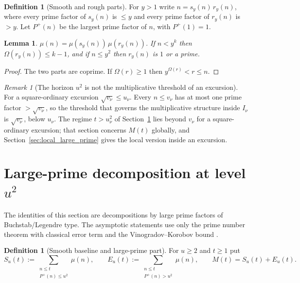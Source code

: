\documentclass[11pt]{amsart}
\numberwithin{equation}{section}
\theoremstyle{plain}
\newtheorem{lemma}[theorem]{Lemma}
\theoremstyle{definition}
\newtheorem{definition}[theorem]{Definition}
\theoremstyle{remark}
\newtheorem{remark}[theorem]{Remark}
\newcommand{\Pp}{P^{+}}
\begin{document}
\begin{definition}[Smooth and rough parts]
\label{def:smooth_rough}
For $y>1$ write $n=s_y(n)\,r_y(n)$, where every prime factor of $s_y(n)$
is $\le y$ and every prime factor of $r_y(n)$ is $>y$. Let $\Pp(n)$ be the
largest prime factor of $n$, with $\Pp(1)=1$.
\end{definition}

\begin{lemma}
\label{lem:rough_part}
$\mu(n)=\mu(s_y(n))\,\mu(r_y(n))$. If $n<y^k$ then $\Omega(r_y(n))\le k-1$,
and if $n\le y^2$ then $r_y(n)$ is $1$ or a prime.
\end{lemma}

\begin{proof}
The two parts are coprime. If $\Omega(r)\ge1$ then $y^{\Omega(r)}<r\le n$.
\end{proof}

\begin{remark}[The horizon $u^2$ is not the multiplicative threshold of an excursion]
\label{rem:horizon_inactive}
For a square-ordinary excursion $\sqrt{v_\nu}\le u_\nu$. Every $n\le v_\nu$
has at most one prime factor $>\sqrt{v_\nu}$, so the threshold that governs
the multiplicative structure inside $I_\nu$ is $\sqrt{v_\nu}$, below
$u_\nu$. The regime $t>u_\nu^2$ of Section~\ref{sec:prime_copy_propagation}
lies beyond $v_\nu$ for a square-ordinary excursion; that section concerns
$M(t)$ globally, and Section~\ref{sec:local_large_prime} gives the local
version inside an excursion.
\end{remark}

\section{Large-prime decomposition at level \texorpdfstring{$u^2$}{u^2}}
\label{sec:prime_copy_propagation}

The identities of this section are decompositions by large prime factors of
Buchstab/Legendre type. The asymptotic statements use only the prime number
theorem with classical error term and the Vinogradov--Korobov bound
\cite{MontgomeryVaughan2007,Walfisz1963}.

\begin{definition}[Smooth baseline and large-prime part]
\label{def:baseline_channel}
For $u\ge2$ and $t\ge1$ put
\begin{equation}
\label{eq:baseline_channel_def}
  S_u(t):=\sum_{\substack{n\le t\\ \Pp(n)\le u^2}}\mu(n),\qquad
  E_u(t):=\sum_{\substack{n\le t\\ \Pp(n)>u^2}}\mu(n),\qquad
  M(t)=S_u(t)+E_u(t).
\end{equation}
\end{definition}
\end{document}
